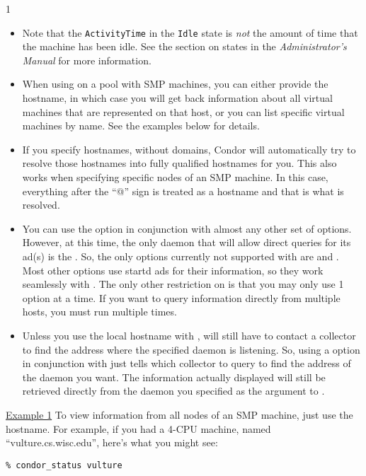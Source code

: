 \begin{ManPage}{\label{man-condor-status}}{1}
\begin{itemize}
	\item Note that the \texttt{ActivityTime} in the \texttt{Idle} state is
	\emph{not} the amount of time that the machine has been idle.  See the
	section on  states in the \emph{Administrator's Manual}
	for more information.

	\item When using  on a pool with SMP machines,
	you can either provide the hostname, in which case you will
	get back information about all virtual machines that are
	represented on that host, or you can list specific virtual
	machines by name.  
	See the examples below for details.

	\item If you specify hostnames, without domains, Condor will
	automatically try to resolve those hostnames into fully
	qualified hostnames for you.
	This also works when specifying specific nodes of an SMP
	machine.
	In this case, everything after the ``@'' sign is treated as a
	hostname and that is what is resolved.

	\item You can use the  option in conjunction with
	almost any other set of options.
	However, at this time, the only daemon that will allow direct
	queries for its ad(s) is the .
	So, the only options currently not supported with
	 are  and .
	Most other options use startd ads for their information, so
	they work seamlessly with .
	The only other restriction on  is that you may
	only use 1  option at a time.
	If you want to query information directly from multiple hosts,
	you must run  multiple times.

	\item Unless you use the local hostname with ,
	 will still have to contact a collector to find
	the address where the specified daemon is listening.
	So, using a  option in conjunction with
	 just tells  which collector to
	query to find the address of the daemon you want.
	The information actually displayed will still be retrieved
	directly from the daemon you specified as the argument to
	.

\end{itemize}

\Examples

\underline{Example 1} To view information from all nodes of an SMP
machine, just use the hostname.
For example, if you had a 4-CPU machine, named
``vulture.cs.wisc.edu'', here's what you might see:
\begin{verbatim}
% condor_status vulture


\end{verbatim}
\end{ManPage}
